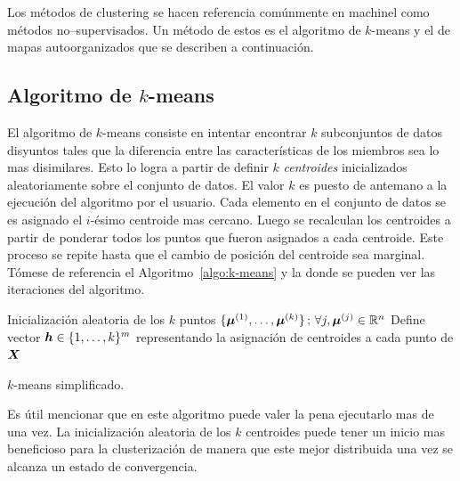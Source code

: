 Los métodos de clustering se hacen referencia comúnmente en \gls{machinel} como métodos no--supervisados. Un método de estos es el algoritmo de $k$-means y el de mapas autoorganizados que se describen a continuación.


\subsection{Algoritmo de $k$-means}
El algoritmo de $k$-means consiste en intentar encontrar $k$ subconjuntos de datos disyuntos tales que la diferencia entre las características de los miembros sea lo mas disimilares. Esto lo logra a partir de definir $k$ \textit{centroides} inicializados aleatoriamente sobre el conjunto de datos. El valor $k$ es puesto de antemano a la ejecución del algoritmo por el usuario. Cada elemento en el conjunto de datos se es asignado el $i$-ésimo centroide mas cercano. Luego se recalculan los centroides a partir de ponderar todos los puntos que fueron asignados a cada centroide. Este proceso se repite hasta que el cambio de posición del centroide sea marginal. Tómese de referencia el Algoritmo~\ref{algo:k-means} y la  donde se pueden ver las iteraciones del algoritmo.

\IncMargin{1em}
\begin{algorithm}[H]
  
  Inicialización aleatoria de los $k$ puntos $\{ {\bm{\mu}}^{(1)}, \ldots, {\bm{\mu}}^{(k)} \} \,;\, \forall j, {\bm{\mu}}^{(j)} \in \mathbb{R}^{n}$\;
  Define vector ${\bm{h}} \in \{1, \ldots, k\}^{m}$ representando la asignación de centroides a cada punto de ${\bm{X}}$\;
  
  \caption{$k$-means simplificado.}
  \label{algo:k-means}
\end{algorithm}
\DecMargin{1em}

Es útil mencionar que en este algoritmo puede valer la pena ejecutarlo mas de una vez. La inicialización aleatoria de los $k$ centroides puede tener un inicio mas beneficioso para la clusterización de manera que este mejor distribuida una vez se alcanza un estado de convergencia.

